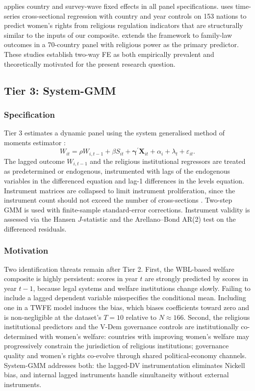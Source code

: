 \documentclass[12pt,a4paper]{article}
\begin{document}
\citet{Seguino2011} applies country and survey-wave fixed effects in all panel specifications. \citet{BenNunBloom2016} uses time-series cross-sectional regression with country and year controls on 153 nations to predict women's rights from religious regulation indicators that are structurally similar to the inputs of our composite. \citet{HtunWeldon2015} extends the framework to family-law outcomes in a 70-country panel with religious power as the primary predictor. These studies establish two-way FE as both empirically prevalent and theoretically motivated for the present research question.

\subsection{Tier 3: System-GMM}

\subsubsection{Specification}

Tier 3 estimates a dynamic panel using the system generalised method of moments estimator \citep{BlundellBond1998}:
\begin{equation}
W_{it} = \rho W_{i,t-1} + \beta S_{it} + \boldsymbol{\gamma}^{\prime} \mathbf{X}_{it} + \alpha_i + \lambda_t + \varepsilon_{it}.
\end{equation}
The lagged outcome $W_{i,t-1}$ and the religious institutional regressors are treated as predetermined or endogenous, instrumented with lags of the endogenous variables in the differenced equation and lag-1 differences in the levels equation. Instrument matrices are collapsed to limit instrument proliferation, since the instrument count should not exceed the number of cross-sections \citep{Roodman2009}. Two-step GMM is used with finite-sample standard-error corrections. Instrument validity is assessed via the Hansen $J$-statistic and the Arellano--Bond AR(2) test on the differenced residuals.

\subsubsection{Motivation}

Two identification threats remain after Tier 2. First, the WBL-based welfare composite is highly persistent: scores in year $t$ are strongly predicted by scores in year $t-1$, because legal systems and welfare institutions change slowly. Failing to include a lagged dependent variable misspecifies the conditional mean. Including one in a TWFE model induces the \citet{Nickell1981} bias, which biases coefficients toward zero and is non-negligible at the dataset's $T = 10$ relative to $N \approx 166$. Second, the religious institutional predictors and the V-Dem governance controls are institutionally co-determined with women's welfare: countries with improving women's welfare may progressively constrain the jurisdiction of religious institutions; governance quality and women's rights co-evolve through shared political-economy channels. System-GMM addresses both: the lagged-DV instrumentation eliminates Nickell bias, and internal lagged instruments handle simultaneity without external instruments.
\end{document}
